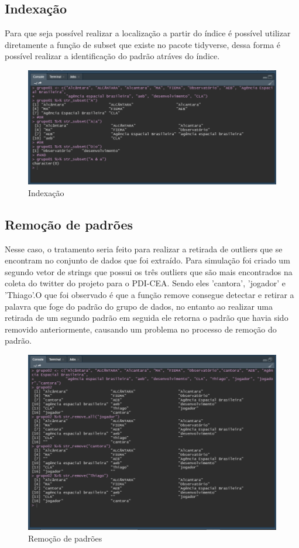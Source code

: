 \documentclass[a4paper]{article}
\begin{document}
\subsection{Indexação}
Para que seja possível realizar a localização a partir do índice é possível utilizar diretamente a função de subset que existe no pacote tidyverse, dessa forma é possível realizar a identificação do padrão atráves do índice.
\begin{figure}[htb!]
    \centering
    \includegraphics[width=0.7\linewidth]{style/image/caso02.png}
    \caption{Indexação}
    \label{fig:Indexação}
\end{figure}
\subsection{Remoção de padrões}
Nesse caso, o tratamento seria feito para realizar a retirada de outliers que se encontram no conjunto de dados que foi extraído. Para simulação foi criado um segundo vetor de strings que possui os três outliers que são mais encontrados na coleta do twitter do projeto para o PDI-CEA. Sendo eles 'cantora', 'jogador' e 'Thiago'.O que foi observado é que a função remove consegue detectar e retirar a palavra que foge do padrão do grupo de dados, no entanto ao realizar uma retirada de um segundo padrão em seguida ele retorna o padrão que havia sido removido anteriormente, causando um problema no processo de remoção do padrão.
\begin{figure}[htb!]
    \centering
    \includegraphics[width=0.7\linewidth]{style/image/caso03.png}
    \caption{Remoção de padrões}
    \label{fig:Remover}
\end{figure}
\end{document}
